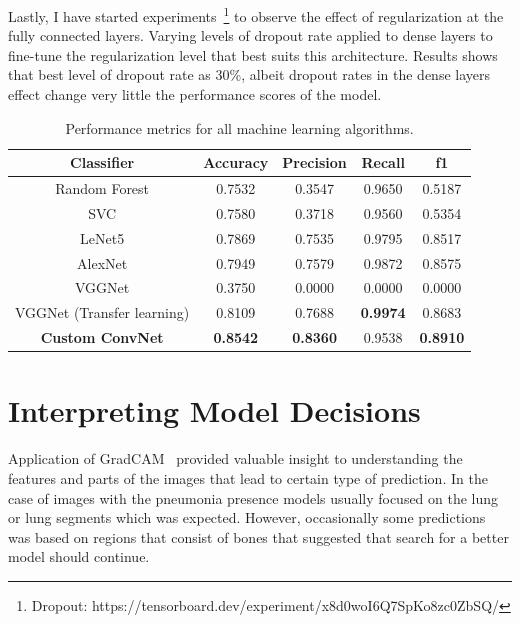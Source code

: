Lastly, I have started experiments~\footnote{Dropout: https://tensorboard.dev/experiment/x8d0woI6Q7SpKo8zc0ZbSQ/} to observe the effect of regularization at the fully connected layers.
Varying levels of dropout rate applied to dense layers to fine-tune the regularization level that best suits this architecture. Results shows that best level of dropout rate as 30\%, albeit dropout rates in the dense layers effect change very little the performance scores of the model.

\begin{table}[H]
    \centering
    \begin{tabular}{||c c c c c||} 
    \hline
    Classifier & Accuracy & Precision & Recall & f1\\ [0.5ex] 
    \hline\hline
    Random Forest & 0.7532 & 0.3547 & 0.9650 & 0.5187\\ 
    \hline
    SVC & 0.7580 & 0.3718 & 0.9560 & 0.5354\\
    \hline
    LeNet5 & 0.7869 & 0.7535 & 0.9795 & 0.8517\\
    \hline
    AlexNet & 0.7949 & 0.7579 & 0.9872 & 0.8575\\
    \hline
    VGGNet & 0.3750 & 0.0000 & 0.0000 & 0.0000\\
    \hline
    VGGNet (Transfer learning) & 0.8109 & 0.7688 & \textbf{0.9974} & 0.8683\\
    \hline
    \textbf{Custom ConvNet} & \textbf{0.8542} & \textbf{0.8360} & 0.9538 & \textbf{0.8910}\\
    \hline
    \end{tabular}
    \caption{Performance metrics for all machine learning algorithms.}
    \label{table:allmlmetrics}
\end{table}

\section{Interpreting Model Decisions}
Application of GradCAM~\cite{cam} provided valuable insight to understanding the features and parts of the images that lead to certain type of prediction.
In the case of images with the pneumonia presence models usually focused on the lung or lung segments which was expected.
However, occasionally some predictions was based on regions that consist of bones that suggested that search for a better model should continue.

